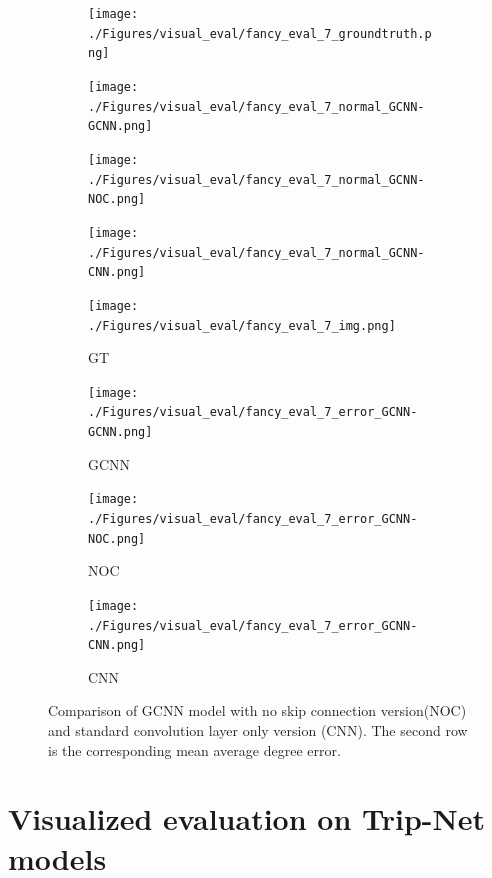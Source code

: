 \documentclass[border=15pt, multi, tikz]{article}
\begin{document}

\begin{figure}[H]
	\centering
	\begin{subfigure}[b]{0.24\linewidth}
		\texttt{[image: ./Figures/visual\_eval/fancy\_eval\_7\_groundtruth.png]}
	\end{subfigure}
	\begin{subfigure}[b]{0.24\linewidth}
		\texttt{[image: ./Figures/visual\_eval/fancy\_eval\_7\_normal\_GCNN-GCNN.png]}
	\end{subfigure}
	\begin{subfigure}[b]{0.24\linewidth}
		\texttt{[image: ./Figures/visual\_eval/fancy\_eval\_7\_normal\_GCNN-NOC.png]}
	\end{subfigure}
	\begin{subfigure}[b]{0.24\linewidth}
		\texttt{[image: ./Figures/visual\_eval/fancy\_eval\_7\_normal\_GCNN-CNN.png]}
	\end{subfigure}
	
	\begin{subfigure}[b]{0.24\linewidth}
		\texttt{[image: ./Figures/visual\_eval/fancy\_eval\_7\_img.png]}
		\caption{GT}
	\end{subfigure}
	\begin{subfigure}[b]{0.24\linewidth}
		\texttt{[image: ./Figures/visual\_eval/fancy\_eval\_7\_error\_GCNN-GCNN.png]}
		\caption{GCNN}
	\end{subfigure}
	\begin{subfigure}[b]{0.24\linewidth}
		\texttt{[image: ./Figures/visual\_eval/fancy\_eval\_7\_error\_GCNN-NOC.png]}
		\caption{NOC}
	\end{subfigure}
	\begin{subfigure}[b]{0.24\linewidth}
		\texttt{[image: ./Figures/visual\_eval/fancy\_eval\_7\_error\_GCNN-CNN.png]}
		\caption{CNN}
	\end{subfigure}
	
	
	\caption{Comparison of GCNN model with no skip connection version(NOC) and standard convolution layer only version (CNN). The second row is the corresponding mean average degree error.}
	\label{fig:gcnn-eval-multi-model}
\end{figure}



\newpage
\section{Visualized evaluation on Trip-Net models }
\end{document}
